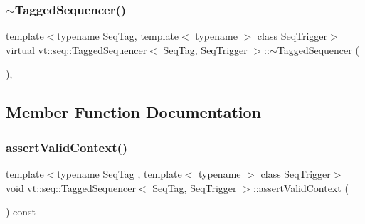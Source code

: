 \subsubsection{\texorpdfstring{$\sim$\+Tagged\+Sequencer()}{~TaggedSequencer()}}
{\footnotesize\ttfamily template$<$typename Seq\+Tag, template$<$ typename $>$ class Seq\+Trigger$>$ \\
virtual \hyperlink{structvt_1_1seq_1_1_tagged_sequencer}{vt\+::seq\+::\+Tagged\+Sequencer}$<$ Seq\+Tag, Seq\+Trigger $>$\+::$\sim$\hyperlink{structvt_1_1seq_1_1_tagged_sequencer}{Tagged\+Sequencer} (\begin{DoxyParamCaption}{ }\end{DoxyParamCaption})\hspace{0.3cm}{\ttfamily [inline]}, {\ttfamily [virtual]}}



\subsection{Member Function Documentation}
\mbox{\label{structvt_1_1seq_1_1_tagged_sequencer_ad611e5f85e87bcd6fb56058bacc64fa3}} 
\subsubsection{\texorpdfstring{assert\+Valid\+Context()}{assertValidContext()}}
{\footnotesize\ttfamily template$<$typename Seq\+Tag , template$<$ typename $>$ class Seq\+Trigger$>$ \\
void \hyperlink{structvt_1_1seq_1_1_tagged_sequencer}{vt\+::seq\+::\+Tagged\+Sequencer}$<$ Seq\+Tag, Seq\+Trigger $>$\+::assert\+Valid\+Context (\begin{DoxyParamCaption}{ }\end{DoxyParamCaption}) const}

\mbox{\label{structvt_1_1seq_1_1_tagged_sequencer_a82dcbcf1d5d0d5370fee8f9ab63e0f30}} 
